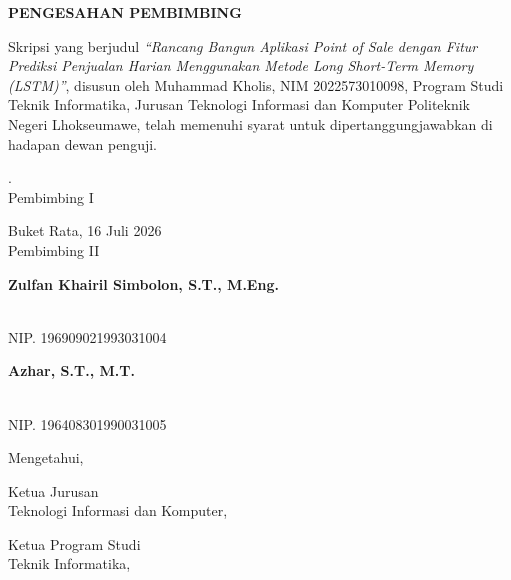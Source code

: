 \documentclass[12pt, a4paper, onecolumn, oneside]{report}
\begin{document}
\newpage
{}
{}
\begin{center}
{\fontsize{14pt}{16pt}\selectfont\bfseries PENGESAHAN PEMBIMBING}
\end{center}
\vspace{0.5cm}

\noindent Skripsi yang berjudul \textit{``Rancang Bangun Aplikasi Point of Sale dengan Fitur Prediksi Penjualan Harian Menggunakan Metode Long Short-Term Memory (LSTM)''}, disusun oleh Muhammad Kholis, NIM 2022573010098, Program Studi Teknik Informatika, Jurusan Teknologi Informasi dan Komputer Politeknik Negeri Lhokseumawe, telah memenuhi syarat untuk dipertanggungjawabkan di hadapan dewan penguji.

\vspace{1.5cm}

\noindent
\begin{minipage}[t]{0.48\textwidth}
\parbox[t][1cm][t]{\linewidth}{. \\
Pembimbing I}
\end{minipage}%
\begin{minipage}[t]{0.48\textwidth}
\parbox[t][1cm][t]{\linewidth}{Buket Rata, 16 Juli 2026\\
Pembimbing II}
\end{minipage}

\vspace{2cm}

\noindent
\begin{minipage}[t]{0.48\textwidth}
\parbox[t][1cm][t]{\linewidth}{\bfseries Zulfan Khairil Simbolon, S.T., M.Eng.}\\
NIP. 196909021993031004
\end{minipage}%
\begin{minipage}[t]{0.48\textwidth}
\parbox[t][1cm][t]{\linewidth}{\bfseries Azhar, S.T., M.T.}\\
NIP. 196408301990031005
\end{minipage}

\vspace{1.5cm}

\begin{center}
Mengetahui,
\end{center}

\vspace{0.3cm}

\noindent
\begin{minipage}[t]{0.4\textwidth}
\parbox[t][1cm][t]{\linewidth}{Ketua Jurusan\\
Teknologi Informasi dan Komputer,}
\end{minipage}\hfill
\begin{minipage}[t]{0.4\textwidth}
\parbox[t][1cm][t]{\linewidth}{Ketua Program Studi\\
Teknik Informatika,}
\end{minipage}
\end{document}
